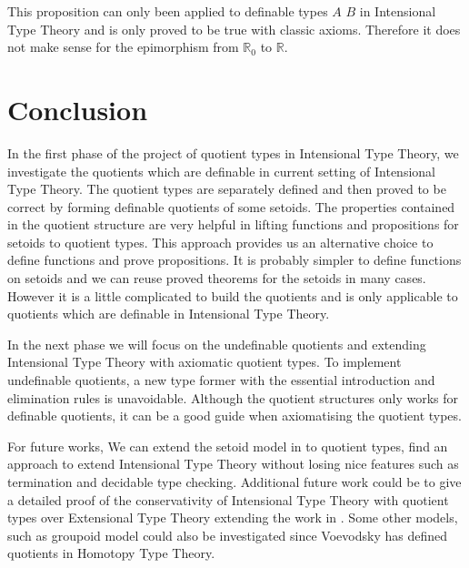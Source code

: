 \documentclass{article}
\theoremstyle{definition}
\newcommand{\R}{\mathbb{R}}
\newcommand{\itt}{Intensional Type Theory}
\newcommand{\ett}{Extensional Type Theory}
\begin{document}
This proposition can only been applied to definable types $A$ $B$ in \itt{} and is
only proved to be true with classic axioms. Therefore it does not make
sense for the epimorphism from $\R_0$ to $\R$.

\section{Conclusion}
\label{sec:cl}

In the first phase of the project of quotient types in \itt{}, we
investigate the quotients which are definable in current setting of
\itt{}. The quotient types are separately defined and then proved to
be correct by forming definable quotients of some setoids. The
properties contained in the quotient structure are very helpful in
lifting functions and propositions for setoids to quotient types. This
approach provides us an alternative choice to define functions and
prove propositions.
It is probably simpler to define functions on setoids and we can
 reuse proved theorems for the setoids in many cases.
However it is a little complicated to build the quotients and is only applicable to quotients which are definable in \itt{}.

In the next phase we will focus on the undefinable quotients and
extending \itt{} with axiomatic quotient types. To implement
undefinable quotients, a new type former with the essential
introduction and elimination rules is unavoidable. Although the
quotient structures only works for definable quotients, it can be a
good guide when axiomatising the quotient types. 

For future works, We can extend the setoid model in \cite{alt:99} to
quotient types, find an approach to extend \itt{} without losing
nice features such as termination and decidable type checking. 
Additional future work could be to give a detailed proof of the
conservativity of \itt{} with quotient types over \ett{} extending the
work in \cite{hof:95:con}. Some other models, such as groupoid model
could also be investigated since Voevodsky has defined quotients in
Homotopy Type Theory\cite{voe:hset}.

% 
\end{document}

